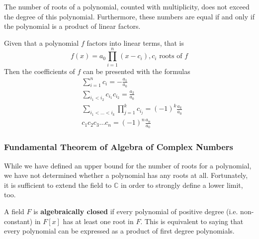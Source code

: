     \begin{theorem}
      The number of roots of a polynomial, counted with multiplicity, does not exceed the degree of this polynomial. Furthermore, these numbers are equal if and only if the polynomial is a product of linear factors.
    \end{theorem}

    \begin{theorem}
      Given that a polynomial $f$ factors into linear terms, that is 
      \begin{equation}
        f(x) = a_0 \prod_{i = 1}^{n} (x - c_i), c_i \text{ roots of } f
      \end{equation}
      Then the coefficients of $f$ can be presented with the formulas
      \begin{align*}
        & \sum_{i=1}^n c_i = - \frac{a_1}{a_0} \\
        & \sum_{i_1 < i_2} c_{i_1} c_{i_2} = \frac{a_2}{a_0} \\
        & \sum_{i_1< ...< i_k} \prod_{j = 1}^{k} c_{i_j} = (-1)^k \frac{a_k}{a_0} \\
        & c_1 c_2 c_3 ... c_n = (-1)^n \frac{a_n}{a_0}
      \end{align*}
    \end{theorem}

  \subsubsection{Fundamental Theorem of Algebra of Complex Numbers}

    While we have defined an upper bound for the number of roots for a polynomial, we have not determined whether a polynomial has any roots at all. Fortunately, it is sufficient to extend the field to $\mathbb{C}$ in order to strongly define a lower limit, too. 

    \begin{definition}
      A field $F$ is \textbf{algebraically closed} if every polynomial of positive degree (i.e. non-constant) in $F[x]$ has at least one root in $F$. This is equivalent to saying that every polynomial can be expressed as a product of first degree polynomials.
    \end{definition}

